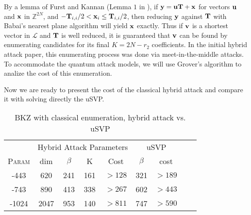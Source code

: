 \documentclass{llncs}
\newcommand{\Lcal}{{\mathcal L}}
\newcommand{\ZZ}{\mathbb{Z}}
\newcommand{\bfu}{{\bf u}}
\newcommand{\bfv}{{\bf v}}
\newcommand{\bfx}{{\bf x}}
\newcommand{\bfy}{{\bf y}}
\newcommand{\bfT}{{\bf T}}
\newcommand{\ntru}{{\sf{NTRU}}}
\newcommand{\<}{\langle}
\renewcommand{\>}{\rangle}
\begin{document}
By a lemma of Furst and Kannan (Lemma $1$ in \cite{Nick07}), if $\bfy = \bfu\bfT + \bfx$
for vectors $\bfu$ and $\bfx$ in $\ZZ^{2N}$, and $-\bfT_{i,i}/2 < \bfx_i \le \bfT_{i,i}/2$,
then reducing $\bfy$ against $\bfT$ with Babai's nearest plane algorithm will yield
$\bfx$ exactly. Thus if $\bfv$ is a shortest vector in $\Lcal$ and $\bfT$ is well reduced, it is guaranteed that $\bfv$ can be found by enumerating
candidates for its final $K = 2N-r_2$ coefficients. 
In the initial hybrid attack paper, 
this enumerating 
process  
was done via meet-in-the-middle attacks. To accommodate the quantum
attack models, we will use Grover's algorithm to analize the cost
of this enumeration.

Now we are ready to present the cost of the classical hybrid
attack and compare it with solving directly the uSVP. 


\begin{table}%
\centering\caption{BKZ with classical enumeration, hybrid attack vs. uSVP}
\begin{tabular}{|*{9}{c|}}\hline

                                    &   \multicolumn{4}{c|}{Hybrid Attack Parameters}                                        & \multicolumn{2}{c|}{uSVP}  \\\cline{2-7}

 \textsc{Param}            &   dim   & $\beta$    &  K      &   Cost               &    $\beta$ & cost  \\\hline\hline

\ntru-443     &  620   &   241          &    161    &           $>128$ & 321& $>189$\\

\ntru-743     &   890   &   413           &    338    &     $>267$       & 602 &$>443$   \\
\ntru-1024     &   2047   &   953           &    140    &     $>811$     & 747 & $>590$  \\\hline
\end{tabular}
\end{table}
\end{document}
